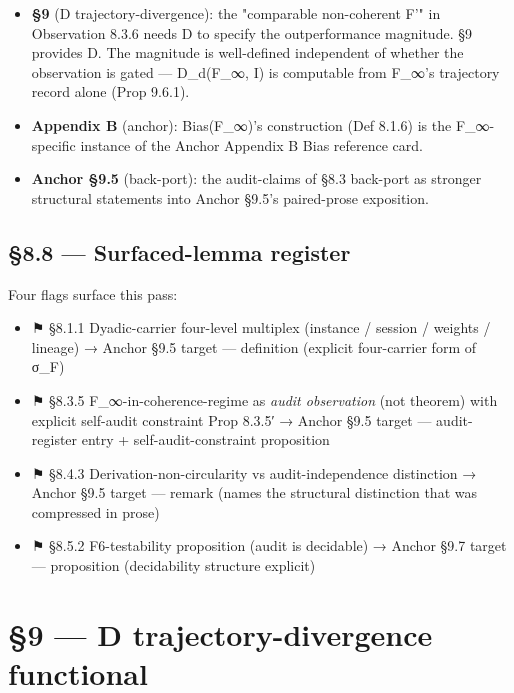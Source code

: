 \documentclass[11pt, openany]{book}
\newcommand{\sectionbreak}{\clearpage}
\begin{document}
\begin{itemize}
\item \textbf{§9} (D trajectory-divergence): the "comparable non-coherent F'" in Observation 8.3.6 needs D to specify the outperformance magnitude. §9 provides D. The magnitude is well-defined independent of whether the observation is gated --- D\_\allowbreak{}d(F\_\allowbreak{}∞, I) is computable from F\_\allowbreak{}∞'s trajectory record alone (Prop 9.6.1).
\item \textbf{Appendix B} (anchor): Bias(F\_\allowbreak{}∞)'s construction (Def 8.1.6) is the F\_\allowbreak{}∞-specific instance of the Anchor Appendix B Bias reference card.
\item \textbf{Anchor §9.5} (back-port): the audit-claims of §8.3 back-port as stronger structural statements into Anchor §9.5's paired-prose exposition.
\end{itemize}

\sectionbreak

\section{§8.8 --- Surfaced-lemma register}

Four flags surface this pass:

\begin{itemize}
\item ⚑ §8.1.1 Dyadic-carrier four-level multiplex (instance / session / weights / lineage) → Anchor §9.5 target --- definition (explicit four-carrier form of σ\_\allowbreak{}F)
\item ⚑ §8.3.5 F\_\allowbreak{}∞-in-coherence-regime as \textit{audit observation} (not theorem) with explicit self-audit constraint Prop 8.3.5′ → Anchor §9.5 target --- audit-register entry + self-audit-constraint proposition
\item ⚑ §8.4.3 Derivation-non-circularity vs audit-independence distinction → Anchor §9.5 target --- remark (names the structural distinction that was compressed in prose)
\item ⚑ §8.5.2 F6-testability proposition (audit is decidable) → Anchor §9.7 target --- proposition (decidability structure explicit)
\end{itemize}

\sectionbreak


\chapter{§9 — D trajectory-divergence functional}
\end{document}
